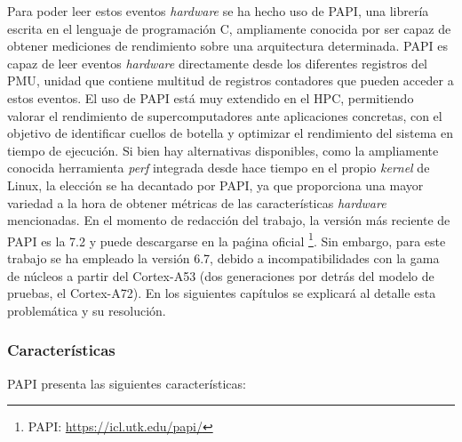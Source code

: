Para poder leer estos eventos \textit{hardware} se ha hecho uso de \ac{PAPI}, una librería escrita en el lenguaje de programación C, ampliamente conocida por ser capaz de obtener mediciones de rendimiento sobre una arquitectura determinada. \ac{PAPI} es capaz de leer eventos \textit{hardware} directamente desde los diferentes registros del \ac{PMU}, unidad que contiene multitud de registros contadores que pueden acceder a estos eventos. El uso de \ac{PAPI} está muy extendido en el \ac{HPC}, permitiendo valorar el rendimiento de supercomputadores ante aplicaciones concretas, con el objetivo de identificar cuellos de botella y optimizar el rendimiento del sistema en tiempo de ejecución. Si bien hay alternativas disponibles, como la ampliamente conocida herramienta \textit{perf} \cite{perf-referencia} integrada desde hace tiempo en el propio \textit{kernel} de Linux, la elección se ha decantado por \ac{PAPI}, ya que proporciona una mayor variedad a la hora de obtener métricas de las características \textit{hardware} mencionadas. En el momento de redacción del trabajo, la versión más reciente de \ac{PAPI} es la 7.2 y puede descargarse en la paǵina oficial \footnote{PAPI: \url{https://icl.utk.edu/papi/}}. Sin embargo, para este trabajo se ha empleado la versión 6.7, debido a incompatibilidades con la gama de núcleos a partir del Cortex-A53 (dos generaciones por detrás del modelo de pruebas, el Cortex-A72). En los siguientes capítulos se explicará al detalle esta problemática y su resolución.

\subsubsection{Características}
\ac{PAPI} presenta las siguientes características:

